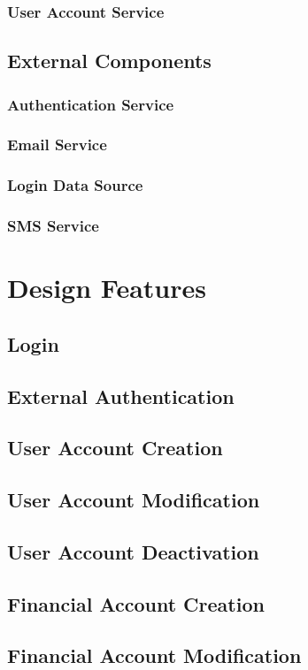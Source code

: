 \documentclass{article}
\begin{document}
\subsubsection{User Account Service}
\subsection{External Components}
\subsubsection{Authentication Service}
\subsubsection{Email Service}
\subsubsection{Login Data Source}
\subsubsection{SMS Service}
\section{Design Features}
\subsection{Login}
\subsection{External Authentication}
\subsection{User Account Creation}
\subsection{User Account Modification}
\subsection{User Account Deactivation}
\subsection{Financial Account Creation}
\subsection{Financial Account Modification}
\end{document}
